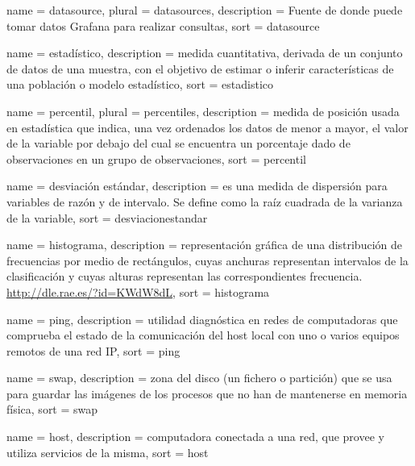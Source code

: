 \newpage

 {
  name        = {datasource},
  plural      = {datasources},
  description = {Fuente de donde puede tomar datos Grafana para realizar consultas},
  sort        = {datasource}
}

 {
  name        = {estadístico},
  description =
    {medida cuantitativa, derivada de un conjunto de datos de una muestra, con
    el objetivo de estimar o inferir características de una población o modelo
    estadístico},
  sort        = {estadistico}
}

 {
  name        = {percentil},
  plural      = {percentiles},
  description =
    {medida de posición usada en estadística que indica, una vez ordenados los
    datos de menor a mayor, el valor de la variable por debajo del cual se
    encuentra un porcentaje dado de observaciones en un grupo de observaciones},
  sort        = {percentil}
}

 {
  name        = {desviación estándar},
  description =
    {es una medida de dispersión para variables de razón y de intervalo. Se
    define como la raíz cuadrada de la varianza de la variable},
  sort        = {desviacionestandar}
}

 {
  name        = {histograma},
  description =
    {representación gráfica de una distribución de frecuencias por medio de
    rectángulos, cuyas anchuras representan intervalos de la clasificación y
    cuyas alturas representan las correspondientes frecuencia.
    \url{http://dle.rae.es/?id=KWdW8dL}},
  sort        = {histograma}
}

 {
  name        = {ping},
  description =
    {utilidad diagnóstica en redes de computadoras que comprueba el estado de
    la comunicación del host local con uno o varios equipos remotos de una red
    IP},
  sort        = {ping}
}

 {
  name        = {swap},
  description =
    {zona del disco (un fichero o partición) que se usa para guardar las
    imágenes de los procesos que no han de mantenerse en memoria física},
  sort        = {swap}
}

 {
  name        = {host},
  description =
    {computadora conectada a una red, que provee y utiliza servicios de la misma},
  sort        = {host}
}

